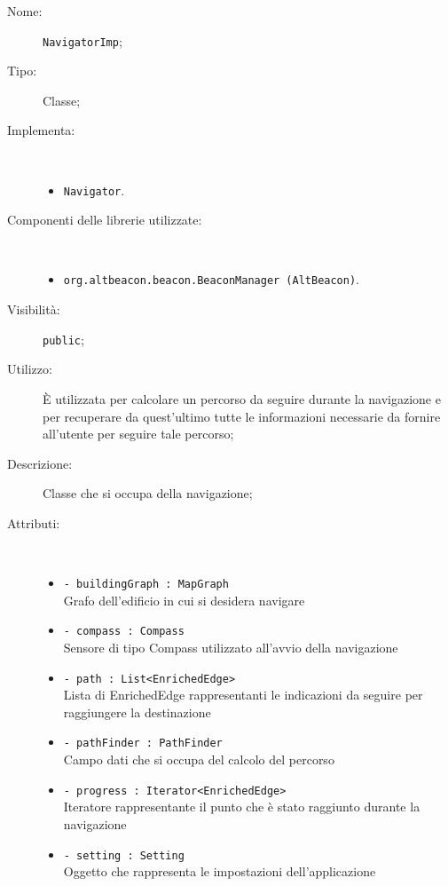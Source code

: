 \documentclass[../DefinizioneDiProdotto.tex]{subfiles}
\begin{document}
\begin{description}
	\item[Nome:] \texttt{NavigatorImp};
	\item[Tipo:] Classe;
	\item[Implementa:] \
	\begin{itemize}
		\item \texttt{Navigator}.
		
	\end{itemize}
	\item[Componenti delle librerie utilizzate:] \
	\begin{itemize}
		\item \texttt{org.altbeacon.beacon.BeaconManager (AltBeacon)}.
		
	\end{itemize}
	\item[Visibilità:] \texttt{public};
	\item[Utilizzo:] È utilizzata per calcolare un percorso da seguire durante la navigazione e per recuperare da quest'ultimo tutte le informazioni necessarie da fornire all'utente per seguire tale percorso;
	\item[Descrizione:] Classe che si occupa della navigazione;
	\item[Attributi:] \
	\begin{itemize}
		\item \texttt{- buildingGraph : MapGraph}\\
		Grafo dell'edificio in cui si desidera navigare
		
		\item \texttt{- compass : Compass}\\
		Sensore di tipo Compass utilizzato all'avvio della navigazione
		
		\item \texttt{- path : List<EnrichedEdge>}\\
		Lista di EnrichedEdge rappresentanti le indicazioni da seguire per raggiungere la destinazione
		
		\item \texttt{- pathFinder : PathFinder}\\
		Campo dati che si occupa del calcolo del percorso
		
		\item \texttt{- progress : Iterator<EnrichedEdge>}\\
		Iteratore rappresentante il punto che è stato raggiunto durante la navigazione
		
		\item \texttt{- setting : Setting}\\
		Oggetto che rappresenta le impostazioni dell'applicazione
		

\end{itemize}
\end{description}
\end{document}

